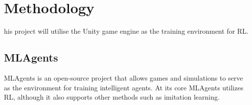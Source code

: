 
%
\let\textcircled=\pgftextcircled\chapter{Methodology}


his project will utilise the Unity game engine as the training environment for RL\@.


\section{MLAgents}
MLAgents is an open-source project that allows games and simulations to serve as the environment for training intelligent agents. At its core MLAgents utilizes RL, although it also supports other methods such as imitation learning.

